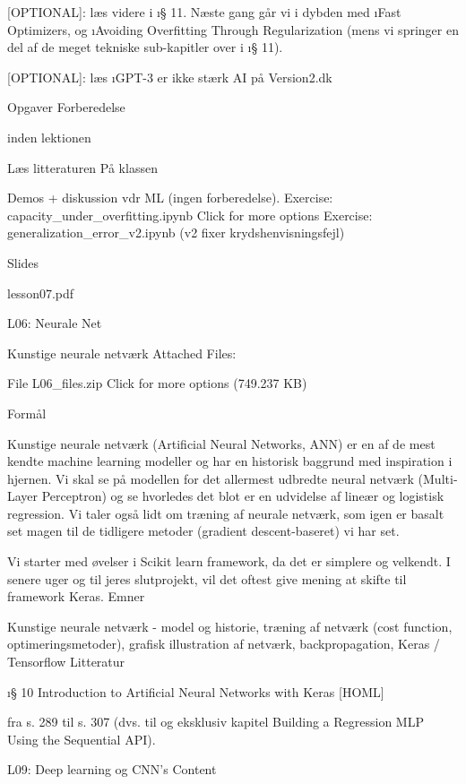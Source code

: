 {[OPTIONAL]: læs videre i \i{§ 11}.  Næste gang går vi i dybden med \i{Fast
Optimizers}, og \i{Avoiding Overfitting Through Regularization} (mens vi
springer en del af de meget tekniske sub-kapitler over i \i{§ 11}).

[OPTIONAL]: læs  \i{GPT-3 er ikke stærk AI} på Version2.dk 

Opgaver Forberedelse

inden lektionen

Læs litteraturen
På klassen

        Demos + diskussion vdr ML (ingen forberedelse).
        Exercise:
            capacity_under_overfitting.ipynb Click for more options
        Exercise:
            generalization_error_v2.ipynb (v2 fixer krydshenvisningsfejl)

Slides

lesson07.pdf 




L06: Neurale Net

Kunstige neurale netværk
Attached Files:

    File L06_files.zip Click for more options (749.237 KB) 

Formål

Kunstige neurale netværk (Artificial Neural Networks, ANN) er en af de mest
kendte machine learning modeller og har en historisk baggrund med inspiration i
hjernen.  Vi skal se på modellen for det allermest udbredte neural netværk
(Multi-Layer Perceptron) og se hvorledes det blot er en udvidelse af lineær og
logistisk regression.  Vi taler også lidt om træning af neurale netværk, som
igen er basalt set magen til de tidligere metoder (gradient descent-baseret) vi
har set.

Vi starter med øvelser i Scikit learn framework, da det er simplere og
velkendt.  I senere uger og til jeres slutprojekt, vil det oftest give mening
at skifte til framework Keras.  Emner

Kunstige neurale netværk - model og historie, træning af netværk (cost
function, optimeringsmetoder), grafisk illustration af netværk,
backpropagation, Keras / Tensorflow Litteratur

\i{§ 10 Introduction to Artificial Neural Networks with Keras} [HOML]

fra s. 289 til s. 307 (dvs. til og eksklusiv kapitel Building a Regression MLP Using the Sequential API).





L09: Deep learning og CNN's
Content

}
